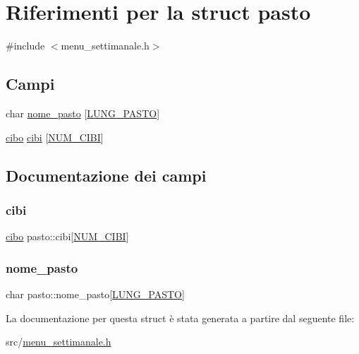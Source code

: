 \hypertarget{structpasto}{}\section{Riferimenti per la struct pasto}
\label{structpasto}


{\ttfamily \#include $<$menu\+\_\+settimanale.\+h$>$}

\subsection*{Campi}
\begin{DoxyCompactItemize}
\item 
char \hyperlink{structpasto_a64f639335ea116474fb622593a998e94}{nome\+\_\+pasto} \mbox{[}\hyperlink{menu__settimanale_8h_ab1b0c8053eda8a811aae87dd756b1530}{L\+U\+N\+G\+\_\+\+P\+A\+S\+TO}\mbox{]}
\item 
\hyperlink{structcibo}{cibo} \hyperlink{structpasto_a616bde7d807aaa730ddb150de7a96296}{cibi} \mbox{[}\hyperlink{menu__settimanale_8h_a70afbf8b7e7e8486fdec619990ec6073}{N\+U\+M\+\_\+\+C\+I\+BI}\mbox{]}
\end{DoxyCompactItemize}


\subsection{Documentazione dei campi}
\mbox{\label{structpasto_a616bde7d807aaa730ddb150de7a96296}} 
\subsubsection{\texorpdfstring{cibi}{cibi}}
{\footnotesize\ttfamily \hyperlink{structcibo}{cibo} pasto\+::cibi\mbox{[}\hyperlink{menu__settimanale_8h_a70afbf8b7e7e8486fdec619990ec6073}{N\+U\+M\+\_\+\+C\+I\+BI}\mbox{]}}

\mbox{\label{structpasto_a64f639335ea116474fb622593a998e94}} 
\subsubsection{\texorpdfstring{nome\+\_\+pasto}{nome\_pasto}}
{\footnotesize\ttfamily char pasto\+::nome\+\_\+pasto\mbox{[}\hyperlink{menu__settimanale_8h_ab1b0c8053eda8a811aae87dd756b1530}{L\+U\+N\+G\+\_\+\+P\+A\+S\+TO}\mbox{]}}



La documentazione per questa struct è stata generata a partire dal seguente file\+:\begin{DoxyCompactItemize}
\item 
src/\hyperlink{menu__settimanale_8h}{menu\+\_\+settimanale.\+h}\end{DoxyCompactItemize}
